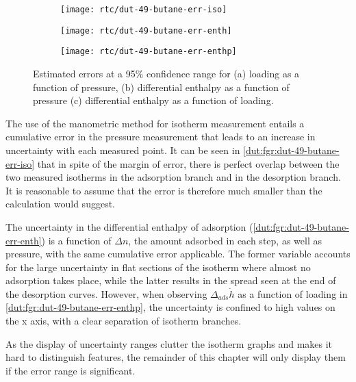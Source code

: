 \begin{figure}[htb]
    \centering
    \begin{subfigure}{0.33\linewidth}
        \texttt{[image: rtc/dut-49-butane-err-iso]}%
        \caption{}\label{dut:fgr:dut-49-butane-err-iso}
    \end{subfigure}%
    \begin{subfigure}{0.33\linewidth}
        \texttt{[image: rtc/dut-49-butane-err-enth]}%
        \caption{}\label{dut:fgr:dut-49-butane-err-enth}
    \end{subfigure}%
    \begin{subfigure}{0.33\linewidth}
        \texttt{[image: rtc/dut-49-butane-err-enthp]}%
        \caption{}\label{dut:fgr:dut-49-butane-err-enthp}
    \end{subfigure}%
    \caption{Estimated errors at a 95\% confidence range for 
    (a) loading as a function of pressure, 
    (b) differential enthalpy as a function of pressure 
    (c) differential enthalpy as a function of loading.}%
    \label{dut:fgr:dut-49-butane-err}
\end{figure}

The use of the manometric method for isotherm measurement entails a 
cumulative error in the pressure measurement that leads to an increase
in uncertainty with each measured point. It can be seen in 
\autoref{dut:fgr:dut-49-butane-err-iso} that in spite of the margin of 
error, there is perfect overlap between the two measured isotherms
in the adsorption branch and in the desorption branch. It is reasonable
to assume that the error is therefore much smaller than the calculation 
would suggest.

The uncertainty in the differential enthalpy of adsorption 
(\autoref{dut:fgr:dut-49-butane-err-enth}) is a 
function of \(\Delta n\), the amount adsorbed in each step, as well
as pressure, with the same cumulative error applicable. The former 
variable accounts for the large uncertainty in flat sections of 
the isotherm where almost no adsorption takes place, while the latter
results in the spread seen at the end of the desorption curves. 
However, when observing \(\Delta_{ads} \dot{h}\) as a function of 
loading in \autoref{dut:fgr:dut-49-butane-err-enthp}, the uncertainty 
is confined to high values on the x axis, with a clear separation
of isotherm branches.

As the display of uncertainty ranges clutter the isotherm graphs and 
makes it hard to distinguish features, the remainder of this chapter 
will only display them if the error range is significant.